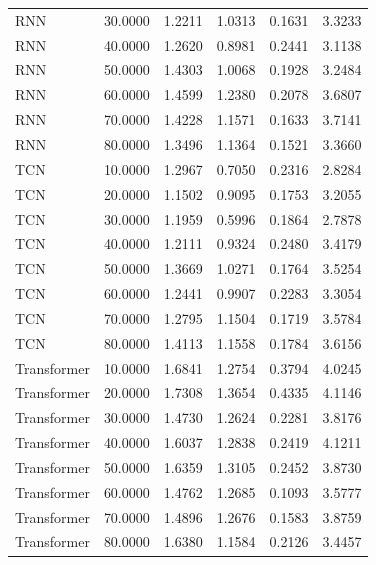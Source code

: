 \begin{tabular}{lrrrrr}
RNN & 30.0000 & 1.2211 & 1.0313 & 0.1631 & 3.3233 \\
RNN & 40.0000 & 1.2620 & 0.8981 & 0.2441 & 3.1138 \\
RNN & 50.0000 & 1.4303 & 1.0068 & 0.1928 & 3.2484 \\
RNN & 60.0000 & 1.4599 & 1.2380 & 0.2078 & 3.6807 \\
RNN & 70.0000 & 1.4228 & 1.1571 & 0.1633 & 3.7141 \\
RNN & 80.0000 & 1.3496 & 1.1364 & 0.1521 & 3.3660 \\
TCN & 10.0000 & 1.2967 & 0.7050 & 0.2316 & 2.8284 \\
TCN & 20.0000 & 1.1502 & 0.9095 & 0.1753 & 3.2055 \\
TCN & 30.0000 & 1.1959 & 0.5996 & 0.1864 & 2.7878 \\
TCN & 40.0000 & 1.2111 & 0.9324 & 0.2480 & 3.4179 \\
TCN & 50.0000 & 1.3669 & 1.0271 & 0.1764 & 3.5254 \\
TCN & 60.0000 & 1.2441 & 0.9907 & 0.2283 & 3.3054 \\
TCN & 70.0000 & 1.2795 & 1.1504 & 0.1719 & 3.5784 \\
TCN & 80.0000 & 1.4113 & 1.1558 & 0.1784 & 3.6156 \\
Transformer & 10.0000 & 1.6841 & 1.2754 & 0.3794 & 4.0245 \\
Transformer & 20.0000 & 1.7308 & 1.3654 & 0.4335 & 4.1146 \\
Transformer & 30.0000 & 1.4730 & 1.2624 & 0.2281 & 3.8176 \\
Transformer & 40.0000 & 1.6037 & 1.2838 & 0.2419 & 4.1211 \\
Transformer & 50.0000 & 1.6359 & 1.3105 & 0.2452 & 3.8730 \\
Transformer & 60.0000 & 1.4762 & 1.2685 & 0.1093 & 3.5777 \\
Transformer & 70.0000 & 1.4896 & 1.2676 & 0.1583 & 3.8759 \\
Transformer & 80.0000 & 1.6380 & 1.1584 & 0.2126 & 3.4457 \\
\bottomrule
\end{tabular}
